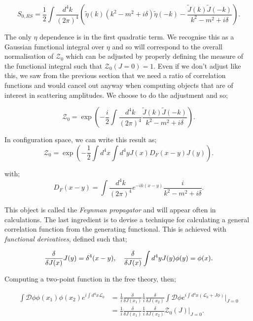 \begin{equation}
S_{0, RS} = \frac{1}{2} \int \frac{d^4 k}{(2 \pi)^4} \left(\tilde{\eta}(k)(k^2 - m^2 + i \delta) \tilde{\eta}(-k) - \frac{\tilde{J}(k)\tilde{J}(-k)}{k^2 - m^2 + i \delta} \right).
\end{equation}

The only $\eta$ dependence is in the first quadratic term. We recognise this as a Gaussian functional integral over $\eta$ and so will correspond to the overall normalisation of $\mathcal{Z}_0$ which can be adjusted by properly defining the measure of the functional integral such that $\mathcal{Z}_0(J = 0) = 1$. Even if we don't adjust like this, we saw from the previous section that we need a ratio of correlation functions and would cancel out anyway when computing objects that are of interest in scattering amplitudes. We choose to do the adjustment and so;

\begin{equation}
\mathcal{Z}_0 = \exp \left( -\frac{i}{2} \int \frac{d^4 k}{(2 \pi)^4} \frac{\tilde{J}(k) \tilde{J}(-k)}{k^2 - m^2 + i \delta} \right).
\end{equation}

In configuration space, we can write this result as;
\begin{equation}
\mathcal{Z}_0 = \exp \left( -\frac{1}{2} \int d^4 x \int d^4 y  J(x) D_F(x - y) J(y) \right).
\end{equation}

with;
\begin{equation}
D_F(x - y) = \int \frac{d^4 k}{(2 \pi)^4} e^{-i k (x - y)} \frac{i}{k^2 - m^2 + i \delta}.
\end{equation}

This object is called the \emph{Feynman propagator} and will appear often in calculations. The last ingredient is to devise a technique for calculating a general correlation function from the generating functional. This is achieved with \emph{functional derivatives}, defined such that;

\begin{equation}
\frac{\delta}{\delta J(x)}J(y) = \delta^4(x - y), \hspace{10 pt} \frac{\delta}{\delta J(x)} \int d^4 y J(y) \phi(y) = \phi(x).
\end{equation}

Computing a two-point function in the free theory, then;

\begin{equation}
\begin{split}
\int \mathcal{D} \phi \phi(x_1) \phi(x_2) e^{i \int d^4 x \mathscr{L}_0}& = \frac{1}{i} \frac{\delta}{\delta J(x_1)}\frac{1}{i} \frac{\delta}{\delta J(x_2)} \int \mathcal{D} \phi e^{i \int d^4x(\mathscr{L}_0 + J \phi)}\biggr\rvert_{J = 0} \\
&=  \frac{1}{i} \frac{\delta}{\delta J(x_1)}\frac{1}{i} \frac{\delta}{\delta J(x_2)} \mathcal{Z}_0(J)\biggr\rvert_{J = 0}.
\end{split}
\end{equation}

